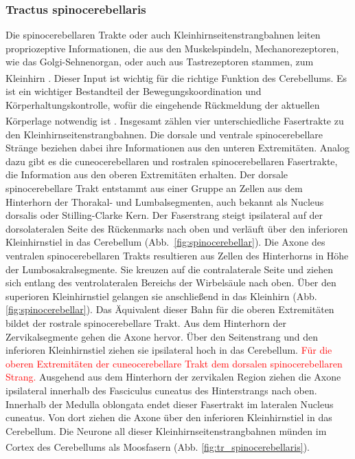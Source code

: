 \documentclass[12pt,a4paper,pdftex]{article}
\begin{document}
\subsubsection{Tractus spinocerebellaris} 
Die spinocerebellaren Trakte oder auch Kleinhirnseitenstrangbahnen leiten propriozeptive Informationen, die aus den Muskelspindeln, Mechanorezeptoren, wie das Golgi-Sehnenorgan, oder auch aus Tastrezeptoren stammen, zum Kleinhirn \textsuperscript{\cite[8]{crossman2014neuroanatomy}}. Dieser Input ist wichtig für die richtige Funktion des Cerebellums. Es ist ein wichtiger Bestandteil der Bewegungskoordination und Körperhaltungskontrolle, wofür die eingehende Rückmeldung der aktuellen Körperlage notwendig ist \textsuperscript{\cite[3]{trepel2011neuroanatomie}}. Insgesamt zählen vier unterschiedliche Fasertrakte zu den Kleinhirnseitenstrangbahnen. Die dorsale und ventrale spinocerebellare Stränge beziehen dabei ihre Informationen aus den unteren Extremitäten. Analog dazu gibt es die cuneocerebellaren und rostralen spinocerebellaren Fasertrakte, die Information aus den oberen Extremitäten erhalten. Der dorsale spinocerebellare Trakt entstammt aus einer Gruppe an Zellen aus dem Hinterhorn der Thorakal- und Lumbalsegmenten, auch bekannt als Nucleus dorsalis oder Stilling-Clarke Kern. Der Faserstrang steigt ipsilateral auf der dorsolateralen Seite des Rückenmarks nach oben und verläuft über den inferioren Kleinhirnstiel in das Cerebellum (Abb.~\ref{fig:spinocerebellar}). Die Axone des ventralen spinocerebellaren Trakts resultieren aus Zellen des Hinterhorns in Höhe der Lumbosakralsegmente. Sie kreuzen auf die contralaterale Seite und ziehen sich entlang des ventrolateralen Bereichs der Wirbelsäule nach oben. Über den superioren Kleinhirnstiel gelangen sie anschließend in das Kleinhirn (Abb. \ref{fig:spinocerebellar}). Das Äquivalent dieser Bahn für die oberen Extremitäten bildet der rostrale spinocerebellare Trakt. Aus dem Hinterhorn der Zervikalsegmente gehen die Axone hervor. Über den Seitenstrang und den inferioren Kleinhirnstiel ziehen sie ipsilateral hoch in das Cerebellum. \textcolor{red}{Für die oberen Extremitäten der cuneocerebellare Trakt dem dorsalen spinocerebellaren Strang.} Ausgehend aus dem Hinterhorn der zervikalen Region ziehen die Axone ipsilateral innerhalb des Fasciculus cuneatus des Hinterstrangs nach oben. Innerhalb der Medulla oblongata endet dieser Fasertrakt im lateralen Nucleus cuneatus. Von dort ziehen die Axone über den inferioren Kleinhirnstiel in das Cerebellum. Die Neurone all dieser Kleinhirnseitenstrangbahnen münden im Cortex des Cerebellums als Moosfasern \textsuperscript{\cite[8]{crossman2014neuroanatomy}} (Abb. \ref{fig:tr_spinocerebellaris}).          
\end{document}

